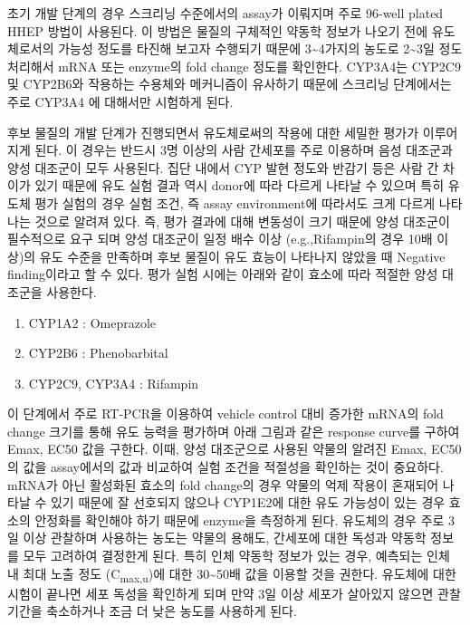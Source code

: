 \documentclass[
  11pt,
  krantz2, a4paper, twoside]{krantz}
\providecommand{\tightlist}{%
  \setlength{\itemsep}{0pt}\setlength{\parskip}{0pt}}
\begin{document}
초기 개발 단계의 경우 스크리닝 수준에서의 assay가 이뤄지며 주로 96-well plated HHEP 방법이 사용된다. 이 방법은 물질의 구체적인 약동학 정보가 나오기 전에 유도체로서의 가능성 정도를 타진해 보고자 수행되기 때문에
3\textasciitilde4가지의 농도로 2\textasciitilde3일 정도 처리해서 mRNA 또는 enzyme의 fold change 정도를 확인한다.
CYP3A4는 CYP2C9 및 CYP2B6와 작용하는 수용체와 메커니즘이 유사하기 때문에 스크리닝 단계에서는 주로 CYP3A4 에 대해서만 시험하게 된다.

후보 물질의 개발 단계가 진행되면서 유도체로써의 작용에 대한 세밀한 평가가 이루어지게 된다. 이 경우는 반드시 3명 이상의 사람 간세포를 주로 이용하며 음성 대조군과 양성 대조군이 모두 사용된다. 집단 내에서 CYP 발현 정도와 반감기 등은 사람 간 차이가 있기 때문에 유도 실험 결과 역시 donor에 따라 다르게 나타날 수 있으며 특히 유도체 평가 실험의 경우 실험 조건, 즉 assay environment에 따라서도 크게 다르게 나타나는 것으로 알려져 있다. 즉, 평가 결과에 대해 변동성이 크기 때문에 양성 대조군이 필수적으로 요구 되며 양성 대조군이 일정 배수 이상 (e.g.,Rifampin의 경우 10배 이상)의 유도 수준을 만족하며 후보 물질이 유도 효능이 나타나지 않았을 때 Negative finding이라고 할 수 있다. 평가 실험 시에는 아래와 같이 효소에 따라 적절한 양성 대조군을 사용한다.

\begin{enumerate}
\def\labelenumi{\arabic{enumi}.}
\tightlist
\item
  CYP1A2 : Omeprazole
\item
  CYP2B6 : Phenobarbital
\item
  CYP2C9, CYP3A4 : Rifampin
\end{enumerate}

이 단계에서 주로 RT-PCR을 이용하여 vehicle control 대비 증가한 mRNA의 fold change 크기를 통해 유도 능력을 평가하며 아래 그림과 같은 response curve를 구하여 Emax, EC50 값을 구한다.
이때, 양성 대조군으로 사용된 약물의 알려진 Emax, EC50의 값을 assay에서의 값과 비교하여 실험 조건을 적절성을 확인하는 것이 중요하다.
mRNA가 아닌 활성화된 효소의 fold change의 경우 약물의 억제 작용이 혼재되어 나타날 수 있기 때문에 잘 선호되지 않으나 CYP1E2에 대한 유도 가능성이 있는 경우 효소의 안정화를 확인해야 하기 때문에 enzyme을 측정하게 된다.
유도체의 경우 주로 3일 이상 관찰하며 사용하는 농도는 약물의 용해도, 간세포에 대한 독성과 약동학 정보를 모두 고려하여 결정한게 된다.
특히 인체 약동학 정보가 있는 경우, 예측되는 인체 내 최대 노출 정도 (C\textsubscript{max,u})에 대한 30\textasciitilde50배 값을 이용할 것을 권한다. 유도체에 대한 시험이 끝나면 세포 독성을 확인하게 되며 만약 3일 이상 세포가 살아있지 않으면 관찰 기간을 축소하거나 조금 더 낮은 농도를 사용하게 된다.
\end{document}
